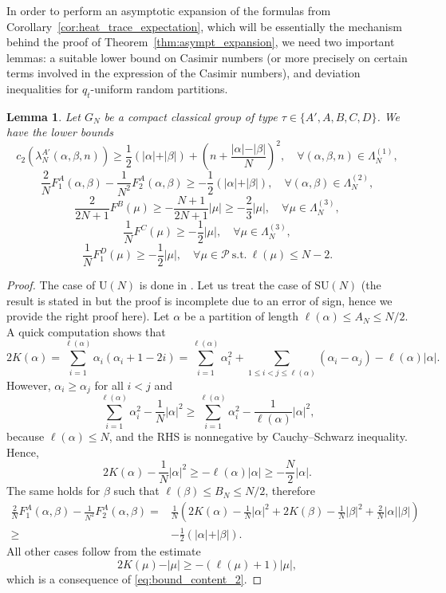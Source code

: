 \documentclass[11pt,a4paper,reqno]{article}
\newtheorem{lemma}[theorem]{Lemma}
\theoremstyle{definition}
\theoremstyle{remark}
\newcommand\SU{{\mathrm{SU}}}
\newcommand\U{{\mathrm U}}
\newcommand\Pfr{\mathscr{P}}
\begin{document}
In order to perform an asymptotic expansion of the formulas from Corollary~\ref{cor:heat_trace_expectation}, which will be essentially the mechanism behind the proof of Theorem~\ref{thm:asympt_expansion}, we need two important lemmas: a suitable lower bound on Casimir numbers (or more precisely on certain terms involved in the expression of the Casimir numbers), and deviation inequalities for $q_t$-uniform random partitions.

\begin{lemma}\label{lem:lb-casimirs}
Let $G_N$ be a compact classical group of type $\tau\in\{A',A,B,C,D\}$. We have the lower bounds
\[
c_2(\lambda_N^{A'}(\alpha,\beta,n)) \geq \frac12(\vert\alpha\vert+\vert\beta\vert)+\left(n+\frac{\vert\alpha\vert-\vert\beta\vert}{N}\right)^2,\quad \forall (\alpha,\beta,n)\in\Lambda_N^{(1)},
\]
\[
\frac{2}{N}F_1^A(\alpha,\beta)-\frac{1}{N^2}F_2^A(\alpha,\beta)\geq -\frac12(\vert\alpha\vert+\vert\beta\vert),\quad  \forall (\alpha,\beta)\in\Lambda_N^{(2)},
\]
\[
\frac{2}{2N+1}F^B(\mu)\geq -\frac{N+1}{2N+1}\vert\mu\vert \geq -\frac{2}{3}\vert\mu\vert ,\quad \forall \mu\in\Lambda_N^{(3)},
\]
\[
\frac{1}{N}F^C(\mu)\geq-\frac12\vert\mu\vert,\quad \forall\mu\in\Lambda_N^{(3)},
\]
\[
\frac{1}{N}F_1^D(\mu)\geq-\frac12\vert\mu\vert,\quad \forall \mu\in\Pfr\ \text{s.t.}\ \ell(\mu)\leq N-2.
\]
\end{lemma}

\begin{proof}
The case of $\U(N)$ is done in \cite[Lemma 4.1]{LM2}. Let us treat the case of $\SU(N)$ (the result is stated in \cite[Lemma 2.9]{Lem} but the proof is incomplete due to an error of sign, hence we provide the right proof here). Let $\alpha$ be a partition of length $\ell(\alpha)\leq A_N\leq N/2$. A quick computation shows that
\[
2K(\alpha)=\sum_{i=1}^{\ell(\alpha)}\alpha_i(\alpha_i+1-2i)=\sum_{i=1}^{\ell(\alpha)}\alpha_i^2+\sum_{1\leq i<j\leq \ell(\alpha)}(\alpha_i-\alpha_j)-\ell(\alpha)\vert\alpha\vert.
\]
However, $\alpha_i\geq \alpha_j$ for all $i<j$ and
\[
\sum_{i=1}^{\ell(\alpha)}\alpha_i^2-\frac1N\vert\alpha\vert^2 \geq \sum_{i=1}^{\ell(\alpha)}\alpha_i^2-\frac{1}{\ell(\alpha)}\vert\alpha\vert^2,
\]
because $\ell(\alpha)\leq N$, and the RHS is nonnegative by Cauchy--Schwarz inequality. Hence,
\[
2K(\alpha)-\frac1N\vert\alpha\vert^2 \geq -\ell(\alpha)\vert\alpha\vert\geq-\frac{N}{2}\vert\alpha\vert.
\]
The same holds for $\beta$ such that $\ell(\beta)\leq B_N\leq N/2$, therefore
\begin{align*}
\frac2N F_1^A(\alpha,\beta)-\frac{1}{N^2}F_2^A(\alpha,\beta) = & \frac1N\left(2K(\alpha)-\frac1N\vert\alpha\vert^2 + 2K(\beta)-\frac1N\vert\beta\vert^2+\frac{2}{N}\vert\alpha\vert\vert\beta\vert\right)\\
\geq & -\frac12(\vert\alpha\vert+\vert\beta\vert).
\end{align*}
All other cases follow from the estimate
\begin{equation}\label{eq:content-size}
2K(\mu)-\vert\mu\vert\geq -(\ell(\mu)+1)\vert\mu\vert,
\end{equation}
which is a consequence of \eqref{eq:bound_content_2}.
\end{proof}
\end{document}

